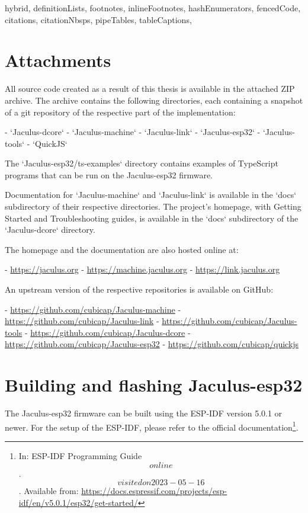 \begin{markdown*}{%
  hybrid,
  definitionLists,
  footnotes,
  inlineFootnotes,
  hashEnumerators,
  fencedCode,
  citations,
  citationNbsps,
  pipeTables,
  tableCaptions,
}

\appendix

\chapter{Attachments}

All source code created as a result of this thesis is available in the attached ZIP archive. The archive contains the following directories, each containing a snapshot of a git repository of the respective part of the implementation:

  - `Jaculus-dcore`
  - `Jaculus-machine`
  - `Jaculus-link`
  - `Jaculus-esp32`
  - `Jaculus-tools`
  - `QuickJS`

The `Jaculus-esp32/ts-examples` directory contains examples of TypeScript programs that can be run on the Jaculus-esp32 firmware.

Documentation for `Jaculus-machine` and `Jaculus-link` is available in the `docs` subdirectory of their respective directories. The project's homepage, with Getting Started and Troubleshooting guides, is available in the `docs` subdirectory of the `Jaculus-dcore` directory.

The homepage and the documentation are also hosted online at:

  - \url{https://jaculus.org}
  - \url{https://machine.jaculus.org}
  - \url{https://link.jaculus.org}

\noindent
An upstream version of the respective repositories is available on GitHub:

  - \url{https://github.com/cubicap/Jaculus-machine}
  - \url{https://github.com/cubicap/Jaculus-link}
  - \url{https://github.com/cubicap/Jaculus-tools}
  - \url{https://github.com/cubicap/Jaculus-dcore}
  - \url{https://github.com/cubicap/Jaculus-esp32}
  - \url{https://github.com/cubicap/quickjs}


\chapter{Building and flashing Jaculus-esp32}

The Jaculus-esp32 firmware can be built using the ESP-IDF version 5.0.1 or newer. For the setup of the ESP-IDF, please refer to the official documentation\footnote{In: ESP-IDF Programming Guide \[online\]. \[visited on 2023-05-16\]. Available from: \url{https://docs.espressif.com/projects/esp-idf/en/v5.0.1/esp32/get-started/}}.


\end{markdown*}

